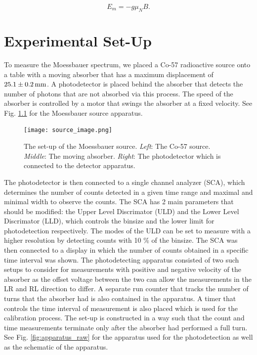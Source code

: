 \documentclass[a4paper]{report}
\numberwithin{equation}{section}
\begin{document}
\begin{equation}
		E_{m} = - g \mu _{N} B.
\end{equation}


\chapter{Experimental Set-Up}

To measure the Moessbauer spectrum, we placed a Co-57 radioactive source onto a table with a moving absorber 
that has a maximum displacement of $\SI[]{25.1 \pm 0.2}[]{\milli\metre}$.  A photodetector is placed 
behind the absorber that detects the number of photons that are not absorbed via this process. The speed of the 
absorber is controlled by a motor that swings the absorber at a fixed velocity. See Fig. \ref{fig:apparatus_source}
for the Moessbauer source apparatus. \par 

\begin{figure}[htb!]
	\centering
	\texttt{[image: source\_image.png]}

	\caption{The set-up of the Moessbauer source. \textit{Left}: The Co-57 source. \textit{Middle}: 
	The moving absorber. \textit{Right}: The photodetector which is connected to the detector apparatus.
	}
	\label{fig:apparatus_source}
\end{figure}

The photodetector is then connected to a single channel analyzer (SCA), which determines the number of counts detected
in a given time range and maximal and minimal width to observe the counts. The SCA has 2 main parameters that should be modified:
the Upper Level Discrimator (ULD) and the Lower Level Discrimator (LLD), which controls the binsize and the lower limit for 
photodetection respectively. The modes of the ULD can be set to measure with a higher resolution by detecting counts with 
10 $\%$ of the binsize. The SCA was then connected to a display in which the number of counts obtained in a specific time 
interval was shown. 
The photodetecting apparatus consisted of two such setups to consider for measurements with positive and negative velocity 
of the absorber as the offset voltage between the two can allow the measurements in the LR and RL direction to differ.
A separate run counter that tracks the number of turns that the absorber had is also contained in the apparatus. A timer 
that controls the time interval of measurement is also placed which is used for the calibration process. The set-up is 
constructed in a way such that the count and time measurements terminate only after the absorber had performed a full turn. 
See Fig. \ref{fig:apparatus_raw} for the apparatus used for the photodetection as well as the schematic of the apparatus. \par 
\end{document}
